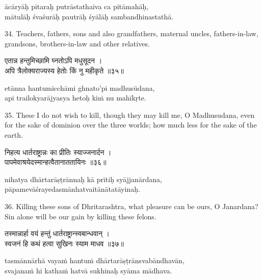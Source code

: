 \begin{transliteration}
ācāryāḥ pitaraḥ putrāstathaiva ca pitāmahāḥ, \\
mātulāḥ śvaśurāḥ pautrāḥ śyālāḥ sambandhinastathā.
\end{transliteration}

34. Teachers, fathers, sons and also grandfathers, maternal uncles,
fathers-in-law, grandsons, brothers-in-law and other relatives.

\begin{gitaverse}
एतान्न हन्तुमिच्छामि घ्नतोऽपि मधुसूदन । \\
अपि त्रैलोक्यराज्यस्य हेतोः किं नु महीकृते ॥३५॥
\end{gitaverse}

\begin{transliteration}
etānna hantumicchāmi ghnato'pi madhusūdana, \\
api trailokyarājyasya hetoḥ kiṁ nu mahīkṛte.
\end{transliteration}

35. These I do not wish to kill, though they may kill me, O Madhusudana, even
for the sake of dominion over the three worlds; how much less for the sake of
the earth.

\begin{gitaverse}
निहत्य धार्तराष्ट्रान्नः का प्रीतिः स्याज्जनार्दन । \\
पापमेवाश्रयेदस्मान्हत्वैतानाततायिनः ॥३६॥
\end{gitaverse}

\begin{transliteration}
nihatya dhārtarāṣṭrānnaḥ kā prītiḥ syājjanārdana, \\
pāpamevāśrayedasmānhatvaitānātatāyinaḥ.
\end{transliteration}

36. Killing these sons of Dhritarashtra, what pleasure can be ours, O
Janardana? Sin alone will be our gain by killing these felons.

\begin{gitaverse}
तस्मान्नार्हा वयं हन्तुं धार्तराष्ट्रान्स्वबान्धवान् । \\
स्वजनं हि कथं हत्वा सुखिनः स्याम माधव ॥३७॥
\end{gitaverse}

\begin{transliteration}
tasmānnārhā vayaṁ hantuṁ dhārtarāṣṭrānsvabāndhavān, \\
svajanaṁ hi kathaṁ hatvā sukhinaḥ syāma mādhava.
\end{transliteration}

